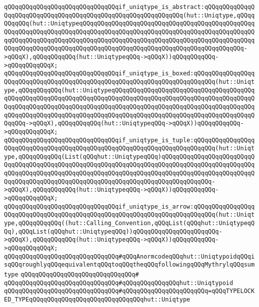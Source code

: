 \verb|qQQqqQQqqQQqqQQqqQQqqQQqqQQqqQQqif_uniqtype_is_abstract:qQQqqQQqqQQqqQQqqQQqqQQqqQQqqQQqqQQqqQQqqQQqqQQqqQQqqQQqqQQqqQQq(hut::Uniqtype,qQQqqQQqqQQq(hut::UniqtypeqQQqqQQqqQQqqQQqqQQqqQQqqQQqqQQqqQQqqQQqqQQqqQQqqQQqqQQqqQQqqQQqqQQqqQQqqQQqqQQqqQQqqQQqqQQqqQQqqQQqqQQqqQQqqQQqqQQqqQQqqQQqqQQqqQQqqQQqqQQqqQQqqQQqqQQqqQQqqQQqqQQqqQQqqQQqqQQqqQQqqQQqqQQqqQQqqQQqqQQqqQQqqQQqqQQqqQQqqQQqqQQqqQQqqQQqqQQqqQQqqQQqqQQqqQQqqQQq->qQQqX),qQQqqQQqqQQq(hut::UniqtypeqQQq->qQQqX))qQQqqQQqqQQq->qQQqqQQqqQQqX;|\newline
\verb|qQQqqQQqqQQqqQQqqQQqqQQqqQQqqQQqif_uniqtype_is_boxed:qQQqqQQqqQQqqQQqqQQqqQQqqQQqqQQqqQQqqQQqqQQqqQQqqQQqqQQqqQQqqQQqqQQqqQQqqQQq(hut::Uniqtype,qQQqqQQqqQQq(hut::UniqtypeqQQqqQQqqQQqqQQqqQQqqQQqqQQqqQQqqQQqqQQqqQQqqQQqqQQqqQQqqQQqqQQqqQQqqQQqqQQqqQQqqQQqqQQqqQQqqQQqqQQqqQQqqQQqqQQqqQQqqQQqqQQqqQQqqQQqqQQqqQQqqQQqqQQqqQQqqQQqqQQqqQQqqQQqqQQqqQQqqQQqqQQqqQQqqQQqqQQqqQQqqQQqqQQqqQQqqQQqqQQqqQQqqQQqqQQqqQQqqQQqqQQqqQQqqQQqqQQq->qQQqX),qQQqqQQqqQQq(hut::UniqtypeqQQq->qQQqX))qQQqqQQqqQQq->qQQqqQQqqQQqX;|\newline
\verb|qQQqqQQqqQQqqQQqqQQqqQQqqQQqqQQqif_uniqtype_is_tuple:qQQqqQQqqQQqqQQqqQQqqQQqqQQqqQQqqQQqqQQqqQQqqQQqqQQqqQQqqQQqqQQqqQQqqQQqqQQq(hut::Uniqtype,qQQqqQQqqQQq(List(qQQqhut::UniqtypeqQQq)qQQqqQQqqQQqqQQqqQQqqQQqqQQqqQQqqQQqqQQqqQQqqQQqqQQqqQQqqQQqqQQqqQQqqQQqqQQqqQQqqQQqqQQqqQQqqQQqqQQqqQQqqQQqqQQqqQQqqQQqqQQqqQQqqQQqqQQqqQQqqQQqqQQqqQQqqQQqqQQqqQQqqQQqqQQqqQQqqQQqqQQqqQQqqQQqqQQqqQQqqQQqqQQqqQQqqQQqqQQqqQQq->qQQqX),qQQqqQQqqQQq(hut::UniqtypeqQQq->qQQqX))qQQqqQQqqQQq->qQQqqQQqqQQqX;|\newline
\verb|qQQqqQQqqQQqqQQqqQQqqQQqqQQqqQQqif_uniqtype_is_arrow:qQQqqQQqqQQqqQQqqQQqqQQqqQQqqQQqqQQqqQQqqQQqqQQqqQQqqQQqqQQqqQQqqQQqqQQqqQQq(hut::Uniqtype,qQQqqQQqqQQq((hut::Calling_Convention,qQQqList(qQQqhut::UniqtypeqQQq),qQQqList(qQQqhut::UniqtypeqQQq))qQQqqQQqqQQqqQQqqQQqqQQq->qQQqX),qQQqqQQqqQQq(hut::UniqtypeqQQq->qQQqX))qQQqqQQqqQQq->qQQqqQQqqQQqX;|\newline
\newline
\newline
\verb|qQQqqQQqqQQqqQQqqQQqqQQqqQQqqQQq#qQQqAnormcodeqQQqhut::UniqtypoidqQQqisqQQqroughlyqQQqequivalentqQQqtoqQQqtheqQQqfollowingqQQqMythrylqQQqsumtype|\newline
\verb|qQQqqQQqqQQqqQQqqQQqqQQqqQQqqQQq#|\newline
\verb|qQQqqQQqqQQqqQQqqQQqqQQqqQQqqQQq#qQQqqQQqqQQqqQQqhut::Uniqtypoid|\newline
\verb|qQQqqQQqqQQqqQQqqQQqqQQqqQQqqQQq#qQQqqQQqqQQqqQQqqQQqqQQq=qQQqTYPELOCKED_TYPEqQQqqQQqqQQqqQQqqQQqqQQqqQQqqQQqhut::Uniqtype|\newline
